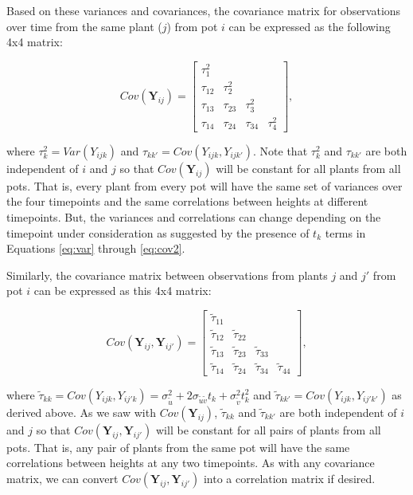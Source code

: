 \documentclass[
]{krantz}
\begin{document}
Based on these variances and covariances, the covariance matrix for observations over time from the same plant (\(j\)) from pot \(i\) can be expressed as the following 4x4 matrix:

\[  Cov(\textbf{Y}_{ij}) = \left[
          \begin{array}{cccc}
            \tau_{1}^{2} & & & \\
            \tau_{12} & \tau_{2}^{2} & & \\
            \tau_{13} & \tau_{23} & \tau_{3}^{2} & \\
            \tau_{14} & \tau_{24} & \tau_{34} & \tau_{4}^{2}
          \end{array} \right], \]

where \(\tau_{k}^{2}=Var(Y_{ijk})\) and \(\tau_{kk'}=Cov(Y_{ijk},Y_{ijk'})\). Note that \(\tau_{k}^{2}\) and \(\tau_{kk'}\) are both independent of \(i\) and \(j\) so that \(Cov(\textbf{Y}_{ij})\) will be constant for all plants from all pots. That is, every plant from every pot will have the same set of variances over the four timepoints and the same correlations between heights at different timepoints. But, the variances and correlations can change depending on the timepoint under consideration as suggested by the presence of \(t_k\) terms in Equations \eqref{eq:var} through \eqref{eq:cov2}.

Similarly, the covariance matrix between observations from plants \(j\) and \(j'\) from pot \(i\) can be expressed as this 4x4 matrix:

\[  Cov(\textbf{Y}_{ij},\textbf{Y}_{ij'}) = \left[
          \begin{array}{cccc}
            \tilde{\tau}_{11} & & & \\
            \tilde{\tau}_{12} & \tilde{\tau}_{22} & & \\
            \tilde{\tau}_{13} & \tilde{\tau}_{23} & \tilde{\tau}_{33} & \\
            \tilde{\tau}_{14} & \tilde{\tau}_{24} & \tilde{\tau}_{34} & \tilde{\tau}_{44}
          \end{array} \right], \]

where \(\tilde{\tau}_{kk}=Cov(Y_{ijk},Y_{ij'k})=\sigma_{\tilde{u}}^{2}+2\sigma_{\tilde{u}\tilde{v}}t_{k}+\sigma_{\tilde{v}}^{2}t_{k}^{2}\) and \(\tilde{\tau}_{kk'}=Cov(Y_{ijk},Y_{ij'k'})\) as derived above. As we saw with \(Cov(\textbf{Y}_{ij})\), \(\tilde{\tau}_{kk}\) and \(\tilde{\tau}_{kk'}\) are both independent of \(i\) and \(j\) so that \(Cov(\textbf{Y}_{ij},\textbf{Y}_{ij'})\) will be constant for all pairs of plants from all pots. That is, any pair of plants from the same pot will have the same correlations between heights at any two timepoints. As with any covariance matrix, we can convert \(Cov(\textbf{Y}_{ij},\textbf{Y}_{ij'})\) into a correlation matrix if desired.
\end{document}
